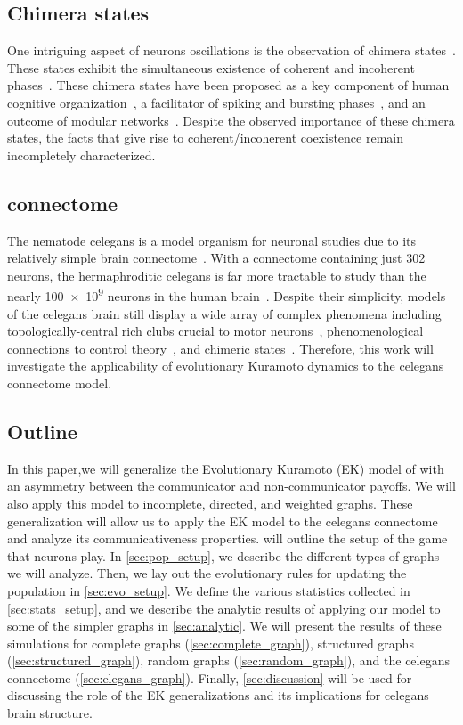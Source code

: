 \documentclass[pdflatex,lineno,referee,sn-mathphys-ay]{sn-jnl}
\begin{document}
\subsection{Chimera states}
One intriguing aspect of neurons oscillations
is the observation of chimera states~\citep
[\eg{}][and references therein]{majhi2019chimera}.
These states exhibit the simultaneous existence
of coherent and incoherent phases~\citep{abrams2004chimera}.
These chimera states have been proposed
as a key component of human cognitive organization~\citep{bansal2019cognitive},
a facilitator of spiking and bursting phases~\citep{santos2017chimera},
and an outcome of modular networks~\citep{hizanidis2016chimera}.
Despite the observed importance of these chimera states,
the facts that give rise to coherent/incoherent coexistence
remain incompletely characterized.

\subsection{ connectome}
The nematode \gls{celegans}
is a model organism for neuronal studies due to
its relatively simple brain connectome~\citep{cook2019whole}.
With a connectome containing just \num{302} neurons,
the hermaphroditic \gls{celegans} is far more tractable to study
than the nearly \num{100e9} neurons
in the human brain~\citep[\eg][]{von2016search}.
Despite their simplicity, models of the \gls{celegans} brain
still display a wide array of complex phenomena including
topologically-central rich clubs
crucial to motor neurons~\citep{towlson2013rich},
phenomenological connections to control theory~\citep{yan2017network},
and chimeric states~\citep{hizanidis2016chimera}.
Therefore, this work will investigate the applicability
of evolutionary Kuramoto dynamics to the \gls{celegans}
connectome model.

\subsection{Outline}
In this paper,we will generalize
the Evolutionary Kuramoto (EK) model
of \citet{tripp2022evolutionary} with an asymmetry between
the communicator and non-communicator payoffs.
We will also apply this model to incomplete, directed, and weighted graphs.
These generalization will allow us to apply the EK model
to the \gls{celegans} connectome
and analyze its communicativeness properties.
 will outline the setup of the game that neurons play.
In \cref{sec:pop_setup}, we describe the different types
of graphs we will analyze.
Then, we lay out the evolutionary rules for updating the population
in \cref{sec:evo_setup}.
We define the various statistics collected in \cref{sec:stats_setup},
and we describe the analytic results of applying our model
to some of the simpler graphs in \cref{sec:analytic}.
We will present the results of these simulations for
complete graphs (\cref{sec:complete_graph}),
structured graphs (\cref{sec:structured_graph}),
random graphs (\cref{sec:random_graph}),
and the \gls{celegans} connectome (\cref{sec:elegans_graph}).
Finally, \cref{sec:discussion} will be used
for discussing the role of the EK generalizations
and its implications for \gls{celegans} brain structure.
\end{document}
